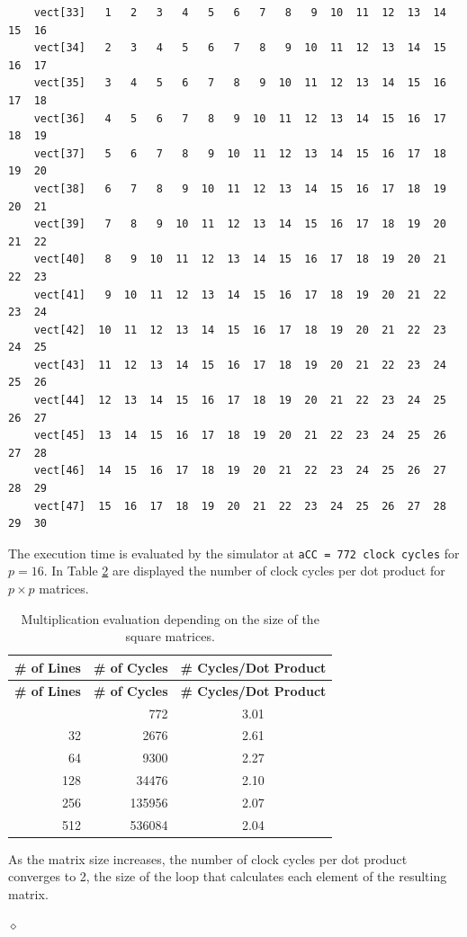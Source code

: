 \begin{exemplu}
{\begin{verbatim}
    vect[33]   1   2   3   4   5   6   7   8   9  10  11  12  13  14  15  16
    vect[34]   2   3   4   5   6   7   8   9  10  11  12  13  14  15  16  17
    vect[35]   3   4   5   6   7   8   9  10  11  12  13  14  15  16  17  18
    vect[36]   4   5   6   7   8   9  10  11  12  13  14  15  16  17  18  19
    vect[37]   5   6   7   8   9  10  11  12  13  14  15  16  17  18  19  20
    vect[38]   6   7   8   9  10  11  12  13  14  15  16  17  18  19  20  21
    vect[39]   7   8   9  10  11  12  13  14  15  16  17  18  19  20  21  22
    vect[40]   8   9  10  11  12  13  14  15  16  17  18  19  20  21  22  23
    vect[41]   9  10  11  12  13  14  15  16  17  18  19  20  21  22  23  24
    vect[42]  10  11  12  13  14  15  16  17  18  19  20  21  22  23  24  25
    vect[43]  11  12  13  14  15  16  17  18  19  20  21  22  23  24  25  26
    vect[44]  12  13  14  15  16  17  18  19  20  21  22  23  24  25  26  27
    vect[45]  13  14  15  16  17  18  19  20  21  22  23  24  25  26  27  28
    vect[46]  14  15  16  17  18  19  20  21  22  23  24  25  26  27  28  29
    vect[47]  15  16  17  18  19  20  21  22  23  24  25  26  27  28  29  30
\end{verbatim}
}
The execution time is evaluated by the simulator at {\tt aCC = 772 clock cycles} for $p = 16$. In Table \ref{tab:mmPerformance} are displayed the number of clock cycles per dot product for $p \times p$ matrices. 

\begin{table}[H]
\small
\centering
\begin{longtable}{|r|r|c|}
\caption{Multiplication evaluation depending on the size of the square matrices.}
\label{tab:mmPerformance} \\
\hline
\textbf{\# of Lines} & \textbf{\# of Cycles} & \textbf{\# Cycles/Dot Product} \\
\hline
\endfirsthead
\hline
\textbf{\# of Lines} & \textbf{\# of Cycles} & \textbf{\# Cycles/Dot Product} \\
\hline
\endhead
\hline
\endfoot
\hline
\endlastfoot
16  & 772     & 3.01 \\ \hline
32  & 2676    & 2.61 \\ \hline
64  & 9300    & 2.27 \\ \hline
128 & 34476   & 2.10 \\ \hline
256 & 135956  & 2.07 \\ \hline
512 & 536084  & 2.04 \\ \hline
\end{longtable}
\end{table}

As the matrix size increases, the number of clock cycles per dot product converges to 2, the size of the loop that calculates each element of the resulting matrix.

$\diamond$
\end{exemplu}

